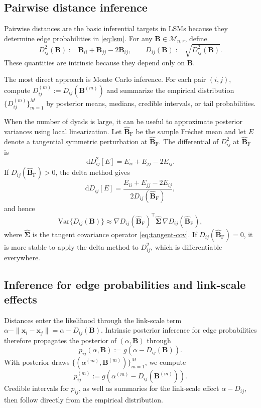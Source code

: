 \documentclass[12pt]{article}
\newcommand{\calMnr}{\mathcal{M}_{n,r}}
\newcommand{\bfB}{\boldsymbol{B}}
\newcommand{\bfSigma}{\boldsymbol{\Sigma}}
\newcommand{\bfx}{\boldsymbol{x}}
\newcommand{\Frechet}{Fr\'{e}chet\xspace}
\newcommand{\BhatF}{\widehat{\bfB}_{\mathrm{F}}}
\begin{document}
\subsection{Pairwise distance inference}\label{subsec:dist-infer}

Pairwise distances are the basic inferential targets in LSMs because they determine edge
probabilities in \eqref{eq:lsm}. For any $\bfB\in\calMnr$, define
\[
D_{ij}^2(\bfB) := \bfB_{ii}+\bfB_{jj}-2\bfB_{ij},\qquad D_{ij}(\bfB):=\sqrt{D_{ij}^2(\bfB)}.
\]
These quantities are intrinsic because they depend only on $\bfB$.

The most direct approach is Monte Carlo inference. For each pair $(i,j)$, compute
$D_{ij}^{(m)}:=D_{ij}(\bfB^{(m)})$ and summarize the empirical distribution
$\{D_{ij}^{(m)}\}_{m=1}^M$ by posterior means, medians, credible intervals, or tail probabilities.

When the number of dyads is large, it can be useful to approximate posterior variances using local
linearization. Let $\BhatF$ be the sample \Frechet mean and let $E$ denote a tangential symmetric
perturbation at $\BhatF$. The differential of $D_{ij}^2$ at $\BhatF$ is
\[
\mathrm{d}D_{ij}^2[E]=E_{ii}+E_{jj}-2E_{ij}.
\]
If $D_{ij}(\BhatF)>0$, the delta method gives
\[
\mathrm{d}D_{ij}[E]=\frac{E_{ii}+E_{jj}-2E_{ij}}{2D_{ij}(\BhatF)},
\]
and hence
\[
\mathrm{Var}\{D_{ij}(\bfB)\}\approx \nabla D_{ij}(\BhatF)^\top \widehat{\bfSigma}\,\nabla D_{ij}(\BhatF),
\]
where $\widehat{\bfSigma}$ is the tangent covariance operator \eqref{eq:tangent-cov}. If
$D_{ij}(\BhatF)=0$, it is more stable to apply the delta method to $D_{ij}^2$, which is
differentiable everywhere.

\subsection{Inference for edge probabilities and link-scale effects}\label{subsec:edgeprob}

Distances enter the likelihood through the link-scale term
$\alpha-\|\bfx_i-\bfx_j\|=\alpha-D_{ij}(\bfB)$. Intrinsic posterior inference for edge probabilities
therefore propagates the posterior of $(\alpha,\bfB)$ through
\[
p_{ij}(\alpha,\bfB):=g\!\left(\alpha-D_{ij}(\bfB)\right).
\]
With posterior draws $\{(\alpha^{(m)},\bfB^{(m)})\}_{m=1}^M$, we compute
\[
p_{ij}^{(m)} := g\!\left(\alpha^{(m)}-D_{ij}(\bfB^{(m)})\right).
\]
Credible intervals for $p_{ij}$, as well as summaries for the link-scale effect
$\alpha-D_{ij}$, then follow directly from the empirical distribution.
\end{document}
